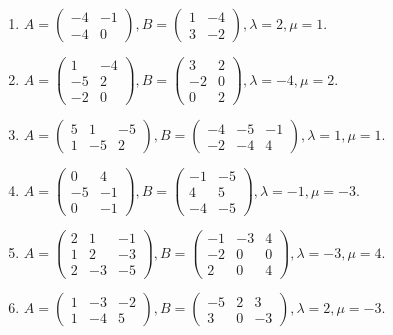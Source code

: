 \begin{enumerate}[label=\arabic*.,]
\item $A = \begin{pmatrix} -4 & -1 \\ -4 & 0 \end{pmatrix},  B = \begin{pmatrix} 1 & -4 \\ 3 & -2 \end{pmatrix},  \lambda = 2,  \mu = 1$.
\item $A = \begin{pmatrix} 1 & -4 \\ -5 & 2 \\ -2 & 0 \end{pmatrix},  B = \begin{pmatrix} 3 & 2 \\ -2 & 0 \\ 0 & 2 \end{pmatrix},  \lambda = -4,  \mu = 2$.
\item $A = \begin{pmatrix} 5 & 1 & -5 \\ 1 & -5 & 2 \end{pmatrix},  B = \begin{pmatrix} -4 & -5 & -1 \\ -2 & -4 & 4 \end{pmatrix},  \lambda = 1,  \mu = 1$.
\item $A = \begin{pmatrix} 0 & 4 \\ -5 & -1 \\ 0 & -1 \end{pmatrix},  B = \begin{pmatrix} -1 & -5 \\ 4 & 5 \\ -4 & -5 \end{pmatrix},  \lambda = -1,  \mu = -3$.
\item $A = \begin{pmatrix} 2 & 1 & -1 \\ 1 & 2 & -3 \\ 2 & -3 & -5 \end{pmatrix},  B = \begin{pmatrix} -1 & -3 & 4 \\ -2 & 0 & 0 \\ 2 & 0 & 4 \end{pmatrix},  \lambda = -3,  \mu = 4$.
\item $A = \begin{pmatrix} 1 & -3 & -2 \\ 1 & -4 & 5 \end{pmatrix},  B = \begin{pmatrix} -5 & 2 & 3 \\ 3 & 0 & -3 \end{pmatrix},  \lambda = 2,  \mu = -3$.

\end{enumerate}
